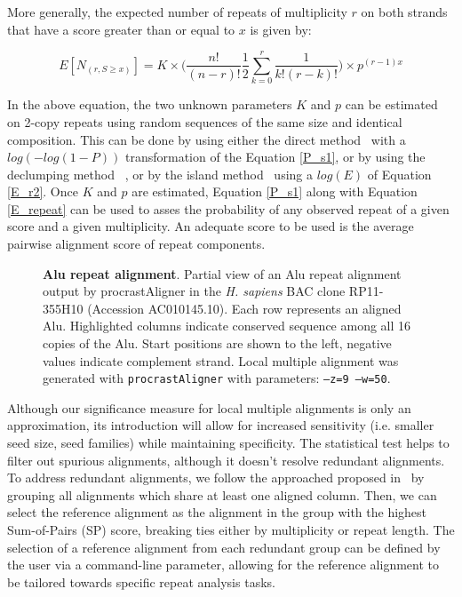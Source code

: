 \documentclass[9.5pt,journal,final,finalsubmission,twocolumn]{IEEEtran}
\begin{document}
More generally, the expected number of repeats of multiplicity $r$ on both strands that have a score greater than or equal to $x$ is given by:

\begin{equation}
    E[ N_{(r, S\geq x)} ]   =  K \times  \Big( \frac{n!}{(n-r)! }  \frac 12 \sum_{k=0}^{r}{\frac{1}{k! (r-k)!}} \Big) \times  p^{(r-1)x}
    \label{E_repeat}
\end{equation}

In the above equation, the two unknown parameters $K$ and $p$ can be estimated on 2-copy repeats using random sequences of the same size and identical composition.  This can be done by using either the direct method~\cite{Olsen1999} with a $log(-log(1-P))$ transformation of the Equation \ref{P_s1}, or by using the declumping method ~\cite{Waterman1994}, or by the island method~\cite{Olsen1999} using a $log(E)$ of Equation \ref{E_r2}. Once $K$ and $p$ are estimated, Equation \ref{P_s1} along with Equation \ref{E_repeat} can be used to asses the probability of any observed repeat of a given score and a given multiplicity. An adequate score to be used is the average pairwise alignment score of repeat components.  

\begin{figure*}[ht!]
\centering {}
\vspace{-1.0cm}
\caption[Alu repeat alignment]%
{\textbf{Alu repeat alignment}. Partial view of an Alu repeat alignment output by procrastAligner in the \emph{H. sapiens} BAC
clone RP11-355H10 (Accession AC010145.10). Each row represents an
aligned Alu. Highlighted columns indicate conserved sequence among all
16 copies of the Alu. Start positions are shown to the left, negative
values indicate complement strand.  Local multiple alignment was
generated with \texttt{procrastAligner} with parameters: \texttt{--z=9
--w=50}.  }
\label{fig-align}
\end{figure*}
Although our significance measure for local multiple alignments is only an approximation, its introduction will allow
for increased sensitivity (i.e. smaller seed size, seed families) while maintaining specificity. The statistical
test helps to filter out spurious alignments, although it doesn't resolve redundant alignments. To address redundant alignments, we follow
the approached proposed in~\cite{ref-related1} by grouping all alignments which share at least one aligned column. Then, we can select the reference alignment
as the alignment in the group with the highest Sum-of-Pairs (SP) score, breaking ties either by multiplicity or repeat length. The selection of a reference alignment from each redundant group can be defined by the user via a command-line parameter, allowing for the reference alignment to be tailored towards specific repeat analysis tasks.
\end{document}
